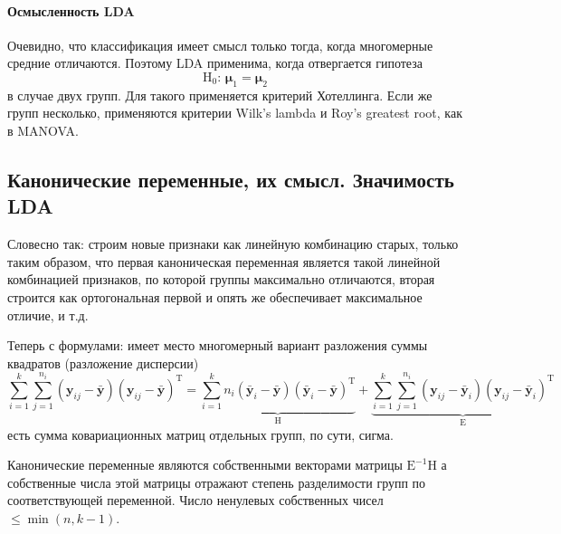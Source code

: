 \documentclass[12pt,a4paper,final]{article}
\newcommand{\1}{\mathds{1}}
\begin{document}
\paragraph{Осмысленность LDA}
Очевидно, что классификация имеет смысл только тогда, когда многомерные средние отличаются. Поэтому LDA применима, когда отвергается гипотеза
$$\mathrm{H}_0:\, \bm \mu_1 = \bm \mu_2$$
в случае двух групп. Для такого применяется критерий Хотеллинга. Если же групп несколько, применяются критерии Wilk's lambda и Roy's greatest root, как в MANOVA.


\subsection{Канонические переменные, их смысл. Значимость LDA}

Словесно так: строим новые признаки как линейную комбинацию старых, только таким образом, что первая каноническая переменная является такой линейной комбинацией признаков, по которой группы максимально отличаются, вторая строится как ортогональная первой и опять же обеспечивает максимальное отличие, и т.д.

Теперь с формулами: имеет место многомерный вариант разложения суммы квадратов (разложение дисперсии)
$$
\sum_{i = 1}^k \sum_{j = 1}^{n_i} (\bm y_{ij} - \bar{\bm y})(\bm y_{ij} - \bar{\bm y})^\mathrm{T} = \underbrace{\sum_{i = 1}^k n_i (\bar{\bm y}_i -  \bar{\bm y})(\bar{\bm y}_i -  \bar{\bm y})^\mathrm{T}}_{\bm{\mathrm{H}}} + \underbrace{\sum_{i = 1}^k \sum_{j = 1}^{n_i} (\bm y_{ij} - \bar{\bm y}_i)(\bm y_{ij} - \bar{\bm y}_i)^\mathrm{T}}_{\bm{\mathrm{E}}}
$$
 есть сумма ковариационных матриц отдельных групп, по сути, сигма.

Канонические переменные являются собственными векторами матрицы $\bm{\mathrm{E}}^{-1} \bm{\mathrm{H}}$ а собственные числа этой матрицы отражают степень разделимости групп по соответствующей переменной. Число ненулевых собственных чисел $\leqslant \min{(n, k-1)}$.
\end{document}
